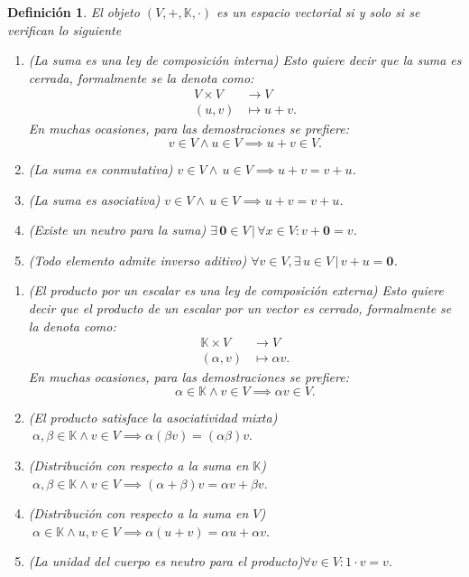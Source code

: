 \documentclass[b5paper, 11pt]{book}
\newcommand{\0}{\mathbf{0}}
\newcommand{\K}{\mathds{K}}
\theoremstyle{estiloB}
\theoremstyle{estiloC}
\newtheorem{unadefi}{Definición}[chapter]
\theoremstyle{estiloD}
\begin{document}
\begin{unadefi}
El objeto $(V, +, \mathds{K}, \cdot)$ es un espacio vectorial si y solo si se verifican lo siguiente

\begin{enumerate}[label=\textbf{A\arabic*)}]
\item \textit{(La suma es una ley de composición interna)} Esto quiere decir que la suma es \textit{cerrada}, formalmente se la denota como:
\begin{align*}
V \times V 	&\to V\\
(u,v) 		&\mapsto u+v.
\end{align*}
En muchas ocasiones, para las demostraciones se prefiere:
\[ v \in V \wedge u \in V \implies u+v \in V. \]
\item \textit{(La suma es conmutativa)} 
\hfill $v \in V \wedge \, u \in V \implies u+v =v+u$.
\item \textit{(La suma es asociativa)}
\hfill $v \in V \wedge \, u \in V \implies u+v= v+u$. 
\item \textit{(Existe un neutro para la suma)}
\hfill $\exists \, \0 \in V \,|\, \forall x \in V : v+ \0= v$.
\item \textit{(Todo elemento admite inverso aditivo)} 
\hfill $\forall v \in V, \exists \, u \in V \,|\, v+ u = \0$.
\end{enumerate}

\begin{enumerate}[label=\textbf{M\arabic*)}]
\item \textit{(El producto por un escalar es una ley de composición externa)} Esto quiere decir que el producto de un escalar por un vector es \textit{cerrado}, formalmente se la denota como:
\begin{align*}
\mathds{K} \times V	&\to V\\
(\alpha , v)			&\mapsto \alpha v.			
\end{align*}
En muchas ocasiones, para las demostraciones se prefiere:
\[ \alpha \in \K \wedge v \in V \implies \alpha v \in V.\]

\item \textit{(El producto satisface la asociatividad mixta)}\\
\textcolor{white}{.}\hfill $\alpha , \beta \in \K \wedge v \in V \implies  \alpha (\beta v)= (\alpha \beta) v.$

\item \textit{(Distribución con respecto a la suma en $\K$)}\\
\textcolor{white}{.}\hfill $\alpha, \beta \in \K \wedge v \in V \implies (\alpha + \beta )v= \alpha v+ \beta v.$

\item \textit{(Distribución con respecto a la suma en $V$)}\\
\textcolor{white}{.}\hfill $\alpha \in \K \wedge u,v \in V \implies \alpha (u+v)= \alpha u+ \alpha v.$

\item \textit{(La unidad del cuerpo es neutro para el producto)}\hfill $\forall v \in V : 1 \cdot v= v.$
\end{enumerate}
\end{unadefi}
\end{document}
